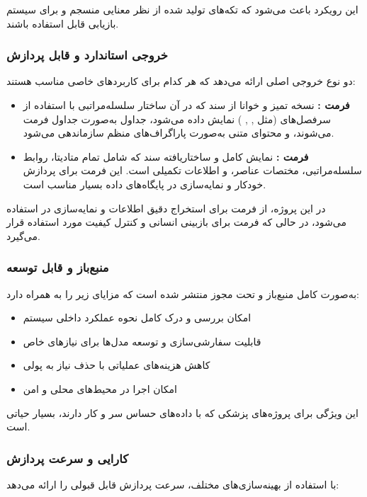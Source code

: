 \noindent
این رویکرد باعث می‌شود که تکه‌های تولید شده از نظر معنایی منسجم و برای سیستم بازیابی قابل استفاده باشند.

\subsubsection{خروجی استاندارد و قابل پردازش}
 دو نوع خروجی اصلی ارائه می‌دهد که هر کدام برای کاربردهای خاصی مناسب هستند:

\begin{itemize}
    \item \textbf{فرمت :} نسخه تمیز و خوانا از سند که در آن ساختار سلسله‌مراتبی با استفاده از سرفصل‌های  (مثل \lr{\#}, \lr{\#\#}, \lr{\#\#\#}) نمایش داده می‌شود، جداول به‌صورت جداول  فرمت می‌شوند، و محتوای متنی به‌صورت پاراگراف‌های منظم سازماندهی می‌شود.
    
    \item \textbf{فرمت :} نمایش کامل و ساختاریافته سند که شامل تمام متادیتا، روابط سلسله‌مراتبی، مختصات عناصر، و اطلاعات تکمیلی است. این فرمت برای پردازش خودکار و نمایه‌سازی در پایگاه‌های داده بسیار مناسب است.
\end{itemize}

\noindent
در این پروژه، از فرمت  برای استخراج دقیق اطلاعات و نمایه‌سازی در  استفاده می‌شود، در حالی که فرمت  برای بازبینی انسانی و کنترل کیفیت مورد استفاده قرار می‌گیرد.

\subsubsection{منبع‌باز و قابل توسعه}
 به‌صورت کامل منبع‌باز و تحت مجوز  منتشر شده است که مزایای زیر را به همراه دارد:

\begin{itemize}
    \item امکان بررسی و درک کامل نحوه عملکرد داخلی سیستم
    \item قابلیت سفارشی‌سازی و توسعه مدل‌ها برای نیازهای خاص
    \item کاهش هزینه‌های عملیاتی با حذف نیاز به  پولی
    \item امکان اجرا در محیط‌های محلی و امن
\end{itemize}

\noindent
این ویژگی برای پروژه‌های پزشکی که با داده‌های حساس سر و کار دارند، بسیار حیاتی است.

\subsubsection{کارایی و سرعت پردازش}
 با استفاده از بهینه‌سازی‌های مختلف، سرعت پردازش قابل قبولی را ارائه می‌دهد:


